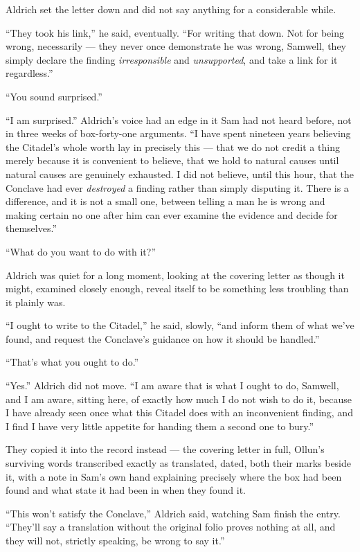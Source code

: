 \sceneBreak

Aldrich set the letter down and did not say anything for a considerable while.

“They took his link,” he said, eventually. “For writing that down. Not for being wrong, necessarily — they never once demonstrate he was wrong, Samwell, they simply declare the finding \textit{irresponsible} and \textit{unsupported}, and take a link for it regardless.”

“You sound surprised.”

“I am surprised.” Aldrich’s voice had an edge in it Sam had not heard before, not in three weeks of box-forty-one arguments. “I have spent nineteen years believing the Citadel’s whole worth lay in precisely this — that we do not credit a thing merely because it is convenient to believe, that we hold to natural causes until natural causes are genuinely exhausted. I did not believe, until this hour, that the Conclave had ever \textit{destroyed} a finding rather than simply disputing it. There is a difference, and it is not a small one, between telling a man he is wrong and making certain no one after him can ever examine the evidence and decide for themselves.”

“What do you want to do with it?”

Aldrich was quiet for a long moment, looking at the covering letter as though it might, examined closely enough, reveal itself to be something less troubling than it plainly was.

“I ought to write to the Citadel,” he said, slowly, “and inform them of what we’ve found, and request the Conclave’s guidance on how it should be handled.”

“That’s what you ought to do.”

“Yes.” Aldrich did not move. “I am aware that is what I ought to do, Samwell, and I am aware, sitting here, of exactly how much I do not wish to do it, because I have already seen once what this Citadel does with an inconvenient finding, and I find I have very little appetite for handing them a second one to bury.”

\sceneBreak

They copied it into the record instead — the covering letter in full, Ollun’s surviving words transcribed exactly as translated, dated, both their marks beside it, with a note in Sam’s own hand explaining precisely where the box had been found and what state it had been in when they found it.

“This won’t satisfy the Conclave,” Aldrich said, watching Sam finish the entry. “They’ll say a translation without the original folio proves nothing at all, and they will not, strictly speaking, be wrong to say it.”

